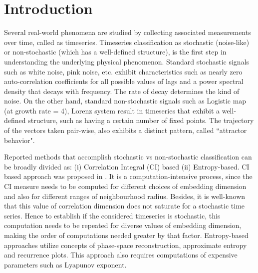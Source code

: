 \documentclass[journal]{IEEEtran}
\begin{document}
	\section{Introduction}
	Several real-world phenomena are studied by collecting associated measurements over time, called as timeseries. Timeseries classification as stochastic (noise-like) or non-stochastic (which has a well-defined structure), is the first step in understanding the underlying physical phenomenon. Standard stochastic signals such as white noise, pink noise, etc. exhibit characteristics such as nearly zero auto-correlation coefficients for all possible values of lags and a power spectral density that decays with frequency. The rate of decay determines the kind of noise. On the other hand, standard non-stochastic signals such as Logistic map (at growth rate = 4), Lorenz system result in timeseries that exhibit a well-defined structure, such as having a certain number of fixed points. The trajectory of the vectors taken  pair-wise, also exhibits a distinct pattern, called ``attractor behavior".
	
	
	Reported methods that accomplish stochastic vs non-stochastic classification can be broadly divided as: (i) Correlation Integral (CI) based (ii) Entropy-based. CI based approach was proposed in \cite{CIGRacia}. It is a computation-intensive process, since the CI measure needs to be computed for different choices of embedding dimension and also for different ranges of neighbourhood radius. Besides, it is well-known that this value of correlation dimension does not saturate for a stochastic time series. Hence to establish if the considered timeseries is stochastic, this computation needs to be repeated for diverse values of embedding dimension, making the order of computations needed greater by that factor. Entropy-based approaches \cite{Boaretto2021, russian, splrecent} utilize concepts of phase-space reconstruction, approximate entropy and recurrence plots. This approach also requires computations of expensive parameters such as Lyapunov exponent.
	
\end{document}
